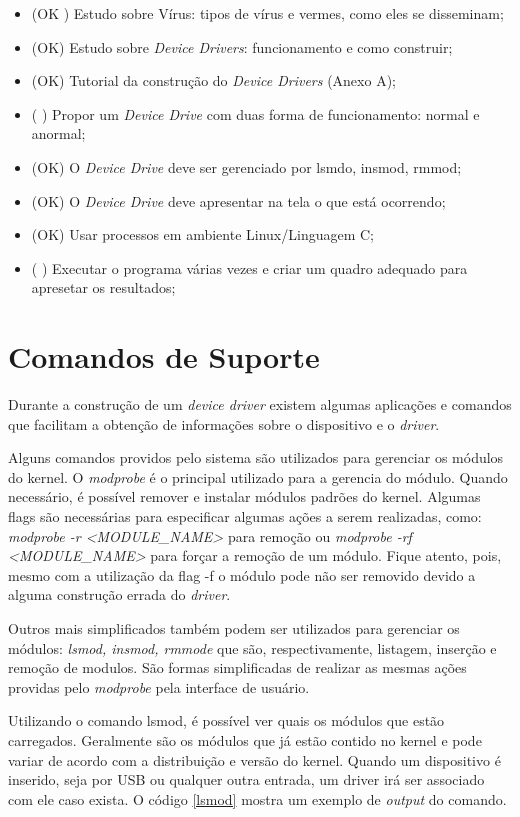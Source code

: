 \begin{itemize}
  \item (OK ) Estudo sobre Vírus: tipos de vírus e vermes, como eles se disseminam;
  \item (OK) Estudo sobre \textit{Device Drivers}: funcionamento e como construir;
  \item (OK) Tutorial da construção do \textit{Device Drivers} (Anexo A);
  \item (  ) Propor um \textit{Device Drive} com duas forma de funcionamento: normal e anormal;
  \item (OK) O \textit{Device Drive} deve ser gerenciado por lsmdo, insmod, rmmod;
  \item (OK) O \textit{Device Drive} deve apresentar na tela o que está ocorrendo;
  \item (OK) Usar processos em ambiente Linux/Linguagem C;
  \item (  ) Executar o programa várias vezes e criar um quadro adequado para apresetar os resultados;
\end{itemize}

\section{Comandos de Suporte}
\label{utils}
Durante a construção de um \textit{device driver} existem algumas aplicações e comandos que facilitam
a obtenção de informações sobre o dispositivo e o \textit{driver}.

Alguns comandos providos pelo sistema são utilizados para gerenciar os módulos do kernel.
O \textit{modprobe} é o principal utilizado para a gerencia do módulo. Quando necessário, é possível
remover e instalar módulos padrões do kernel. Algumas flags são necessárias para especificar
algumas ações a serem realizadas, como: \textit{modprobe -r <MODULE\_NAME>} para remoção ou 
\textit{modprobe -rf <MODULE\_NAME>} para forçar a remoção de um módulo. Fique atento, pois, mesmo
com a utilização da flag -f o módulo pode não ser removido devido a alguma construção errada
do \textit{driver}.

Outros mais simplificados também podem ser utilizados para gerenciar os módulos: \textit{lsmod, insmod, rmmode}
que são, respectivamente, listagem, inserção e remoção de modulos. São formas simplificadas
de realizar as mesmas ações providas pelo \textit{modprobe} pela interface de usuário.

Utilizando o comando lsmod, é possível ver quais os módulos que estão carregados. Geralmente são
os módulos que já estão contido no kernel e pode variar de acordo com a distribuição e versão do
kernel. Quando um dispositivo é inserido, seja por USB ou qualquer outra entrada, um driver irá
ser associado com ele caso exista. O código \ref{lsmod} mostra um exemplo de \textit{output} do comando.

